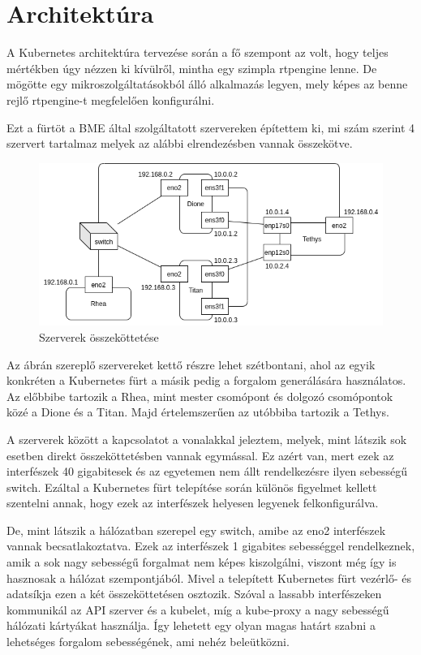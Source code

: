 \chapter{Architektúra}

A Kubernetes architektúra tervezése során a fő szempont az volt, hogy teljes
mértékben úgy nézzen ki kívülről, mintha egy szimpla rtpengine lenne. De 
mögötte egy mikroszolgáltatásokból álló alkalmazás legyen, mely képes
az benne rejlő rtpengine-t megfelelően konfigurálni.

Ezt a fürtöt a BME által szolgáltatott szervereken építettem ki, mi szám szerint
4 szervert tartalmaz melyek az alábbi elrendezésben vannak összekötve.

\begin{figure}[!ht]
	\centering
	\includegraphics[width=1\textwidth, keepaspectratio]{figures/servers.png}
	\caption{Szerverek összeköttetése}
	\label{fig:HVSpaces}
\end{figure}

Az ábrán szereplő szervereket kettő részre lehet szétbontani, ahol az egyik
konkréten a Kubernetes fürt a másik pedig a forgalom generálására használatos.
Az előbbibe tartozik a Rhea, mint mester csomópont és dolgozó csomópontok közé 
a Dione és a Titan. Majd értelemszerűen az utóbbiba tartozik a Tethys. 

A szerverek között a kapcsolatot a vonalakkal jeleztem, melyek, mint látszik
sok esetben direkt összeköttetésben vannak egymással. Ez azért van, mert ezek
az interfészek 40 gigabitesek és az egyetemen nem állt rendelkezésre ilyen 
sebességű switch. Ezáltal a Kubernetes fürt telepítése során különös figyelmet
kellett szentelni annak, hogy ezek az interfészek helyesen legyenek felkonfigurálva.

De, mint látszik a hálózatban szerepel egy switch, amibe az eno2 interfészek vannak
becsatlakoztatva. Ezek az interfészek 1 gigabites sebességgel rendelkeznek, amik
a sok nagy sebességű forgalmat nem képes kiszolgálni, viszont még így is hasznosak
a hálózat szempontjából. Mivel a telepített Kubernetes fürt vezérlő- és adatsíkja
ezen a két összeköttetésen osztozik. Szóval a lassabb interfészeken kommunikál az
API szerver és a kubelet, míg a kube-proxy a nagy sebességű hálózati kártyákat 
használja. Így lehetett egy olyan magas határt szabni a lehetséges forgalom
sebességének, ami nehéz beleütközni. 